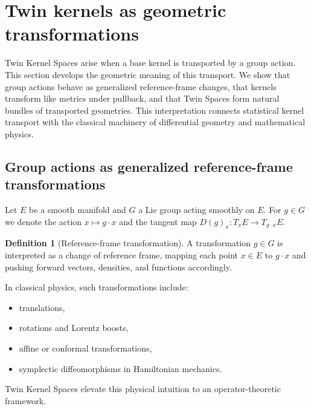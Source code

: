 \documentclass[11pt]{article}
\theoremstyle{definition}
\newtheorem{definition}[theorem]{Definition}
\begin{document}
\section{Twin kernels as geometric transformations}
\label{sec:twin-geometry}

Twin Kernel Spaces arise when a base kernel is transported by a group action.
This section develops the geometric meaning of this transport.
We show that group actions behave as generalized reference-frame changes, that kernels transform like metrics under pullback, and that Twin Spaces form natural bundles of transported geometries.
This interpretation connects statistical kernel transport with the classical machinery of differential geometry and mathematical physics.

\subsection{Group actions as generalized reference-frame transformations}

Let $E$ be a smooth manifold and $G$ a Lie group acting smoothly on $E$.
For $g\in G$ we denote the action $x\mapsto g\cdot x$ and the tangent map $D(g)_x:T_xE\to T_{g\cdot x}E$.

\begin{definition}[Reference-frame transformation]
	A transformation $g\in G$ is interpreted as a change of reference frame, mapping each point $x\in E$ to $g\cdot x$ and pushing forward vectors, densities, and functions accordingly.
\end{definition}

In classical physics, such transformations include:
\begin{itemize}[itemsep=1pt,topsep=3pt]
	\item translations,
	\item rotations and Lorentz boosts,
	\item affine or conformal transformations,
	\item symplectic diffeomorphisms in Hamiltonian mechanics.
\end{itemize}

Twin Kernel Spaces elevate this physical intuition to an operator-theoretic framework.
\end{document}
